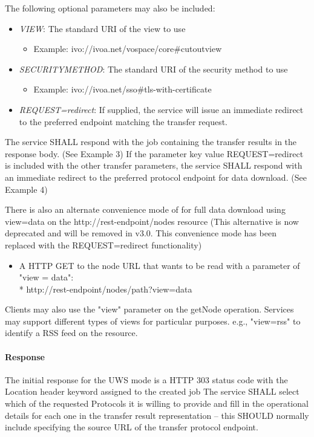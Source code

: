 \documentclass[11pt,a4paper]{ivoa}
\begin{document}
The following optional parameters may also be included:
\begin{itemize}
    \item \emph{VIEW}: The standard URI of the view to use
        \begin{itemize}
           \item Example:  ivo://ivoa.net/vospace/core\#cutoutview
        \end{itemize}
    \item \emph{SECURITYMETHOD}: The standard URI of the security method to use
        \begin{itemize}
           \item Example:  ivo://ivoa.net/sso\#tls-with-certificate
        \end{itemize}
    \item \emph{REQUEST=redirect}: If supplied, the service will issue an immediate redirect to the preferred endpoint matching the transfer request.     
\end{itemize}

The service SHALL respond with the job containing the transfer results in the response body.  (See Example 3)
If the parameter key value REQUEST=redirect is included with the other transfer parameters, the service SHALL respond with an immediate redirect to the preferred protocol endpoint for data download.  (See Example 4)

There is also an alternate convenience mode of for full data download using view=data on the http://rest-endpoint/nodes resource (This alternative is now deprecated and will be removed in v3.0.  This convenience mode has been replaced with the REQUEST=redirect functionality)
\begin{itemize}
    \item A HTTP GET to the node URL that wants to be read with a parameter of "view = data": \\*
        http://rest-endpoint/nodes/path?view=data
\end{itemize}

Clients may also use the "view" parameter on the getNode operation. Services may support different types of views for particular purposes. e.g., "view=rss" to identify a RSS feed on the resource.

\paragraph{Response}
The initial response for the UWS mode is a HTTP 303 status code with the Location header keyword assigned to the created job
The service SHALL select which of the requested Protocols it is willing to provide and fill in the operational details for each one in the transfer result representation -- this SHOULD normally include specifying the source URL of the transfer protocol endpoint.
\end{document}
